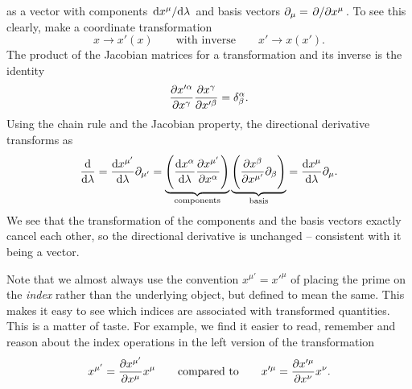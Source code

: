 as a vector with components $\odv{x^{\mu}}/{\lambda}$ and basis vectors $\partial_\mu = \pdv{}/{x^\mu}$.
To see this clearly, make a coordinate transformation
\begin{equation}
	x \rightarrow x'(x)
	\qquad \text{with inverse} \qquad
	x' \rightarrow x(x') .
	\label{eq:gr_summary:coordinate_transformation}
\end{equation}
The product of the Jacobian matrices for a transformation and its inverse is the identity
\begin{equation}
	\pdv{x'^{\alpha}}{x^\gamma} \pdv{x^{\gamma}}{x'^{\beta}} = \delta^{\alpha}_{\beta} .
\end{equation}
Using the chain rule and the Jacobian property, the directional derivative transforms as
\begin{equation}
	\odv{}{\lambda} = \odv{x^{\mu'}}{\lambda} \partial_{\mu'} = \underbrace{\Bigg( \odv{x^{\alpha}}{\lambda} \pdvx{\mu'}{\alpha} \Bigg)}_\text{components} \underbrace{\Bigg( \pdvx{\beta}{\mu'} \partial_{\beta} \Bigg)}_\text{basis} = \odv{x^{\mu}}{\lambda} \partial_{\mu} .
\label{eq:gr_summary:directional_derivative_transformation}
\end{equation}
We see that the transformation of the components and the basis vectors exactly cancel each other, so the directional derivative is unchanged -- consistent with it being a vector.

Note that we almost always use the convention $x^{\mu'} = x'^\mu$ of placing the prime on the \emph{index} rather than the underlying object, but defined to mean the same.
This makes it easy to see which indices are associated with transformed quantities.
This is a matter of taste.
For example, we find it easier to read, remember and reason about the index operations in the left version of the transformation
\begin{equation}
	x^{\mu'} = \pdv{x^{\mu'}}{x^\mu} x^\mu
	\qquad \text{compared to} \qquad
	x'^{\mu} = \pdv{x'^{\mu}}{x^\nu} x^\nu .
\end{equation}

